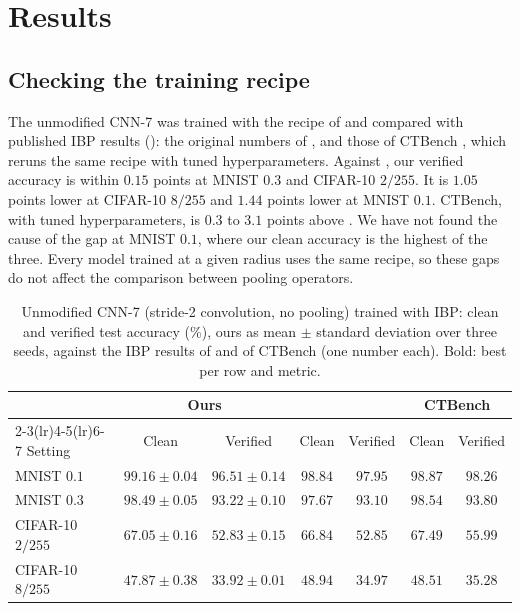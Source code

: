 \documentclass[preprint,12pt]{elsarticle}
\theoremstyle{definition}
\begin{document}
\section{Results}
\label{sec:results}

\subsection{Checking the training recipe}

The unmodified CNN-7 was trained with the recipe of  and compared with published IBP results (): the original numbers of \citet{shi2021}, and those of CTBench \cite{mao2024ctbench}, which reruns the same recipe with tuned hyperparameters. Against \citet{shi2021}, our verified accuracy is within $0.15$ points at MNIST $0.3$ and CIFAR-10 $2/255$. It is $1.05$ points lower at CIFAR-10 $8/255$ and $1.44$ points lower at MNIST $0.1$. CTBench, with tuned hyperparameters, is $0.3$ to $3.1$ points above \citet{shi2021}. We have not found the cause of the gap at MNIST $0.1$, where our clean accuracy is the highest of the three. Every model trained at a given radius uses the same recipe, so these gaps do not affect the comparison between pooling operators.

\begin{table}[ht]
\centering\small
\setlength{\tabcolsep}{4pt}
\caption{Unmodified CNN-7 (stride-2 convolution, no pooling) trained with IBP: clean and verified test accuracy (\%), ours as mean $\pm$ standard deviation over three seeds, against the IBP results of \citet{shi2021} and of CTBench \cite{mao2024ctbench} (one number each). Bold: best per row and metric.}
\label{tab:ref}
\begin{tabular}{lcccccc}
\toprule
 & \multicolumn{2}{c}{Ours} & \multicolumn{2}{c}{\citet{shi2021}} & \multicolumn{2}{c}{CTBench} \\
\cmidrule(lr){2-3}\cmidrule(lr){4-5}\cmidrule(lr){6-7}
Setting & Clean & Verified & Clean & Verified & Clean & Verified \\
\midrule
MNIST $0.1$ & $\mathbf{99.16\pm0.04}$ & $96.51\pm0.14$ & $98.84$ & $97.95$ & $98.87$ & $\mathbf{98.26}$ \\
MNIST $0.3$ & $98.49\pm0.05$ & $93.22\pm0.10$ & $97.67$ & $93.10$ & $\mathbf{98.54}$ & $\mathbf{93.80}$ \\
CIFAR-10 $2/255$ & $67.05\pm0.16$ & $52.83\pm0.15$ & $66.84$ & $52.85$ & $\mathbf{67.49}$ & $\mathbf{55.99}$ \\
CIFAR-10 $8/255$ & $47.87\pm0.38$ & $33.92\pm0.01$ & $\mathbf{48.94}$ & $34.97$ & $48.51$ & $\mathbf{35.28}$ \\
\bottomrule
\end{tabular}
\end{table}
\end{document}
